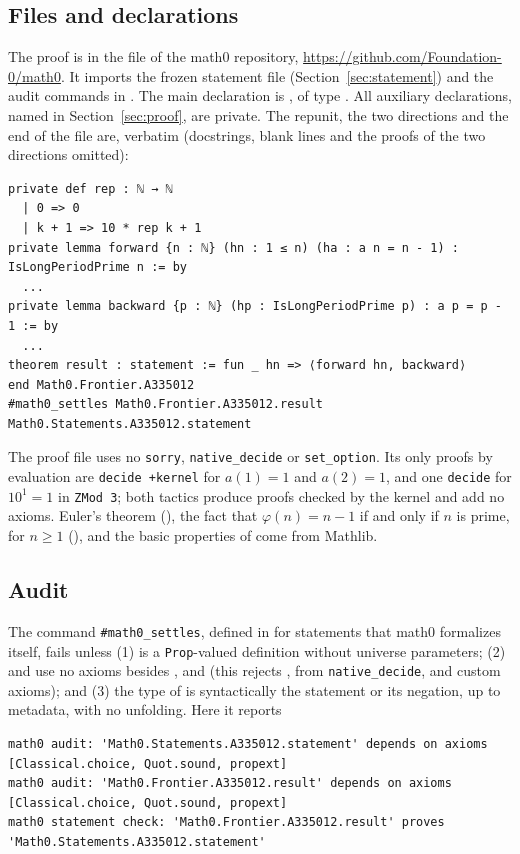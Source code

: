 \documentclass[11pt]{amsart}
\theoremstyle{plain}
\theoremstyle{definition}
\begin{document}
\subsection*{Files and declarations}
The proof is in the file  of the math0 repository, \url{https://github.com/Foundation-0/math0}. It imports the frozen statement file  (Section~\ref{sec:statement}) and the audit commands in . The main declaration is , of type . All auxiliary declarations, named in Section~\ref{sec:proof}, are private. The repunit, the two directions and the end of the file are, verbatim (docstrings, blank lines and the proofs of the two directions omitted):
\begin{lstlisting}
private def rep : ℕ → ℕ
  | 0 => 0
  | k + 1 => 10 * rep k + 1
private lemma forward {n : ℕ} (hn : 1 ≤ n) (ha : a n = n - 1) : IsLongPeriodPrime n := by
  ...
private lemma backward {p : ℕ} (hp : IsLongPeriodPrime p) : a p = p - 1 := by
  ...
theorem result : statement := fun _ hn => ⟨forward hn, backward⟩
end Math0.Frontier.A335012
#math0_settles Math0.Frontier.A335012.result Math0.Statements.A335012.statement
\end{lstlisting}
The proof file uses no \texttt{sorry}, \texttt{native\_decide} or \texttt{set\_option}. Its only proofs by evaluation are \texttt{decide +kernel} for $a(1)=1$ and $a(2)=1$, and one \texttt{decide} for $10^1=1$ in \texttt{ZMod 3}; both tactics produce proofs checked by the kernel and add no axioms. Euler's theorem (), the fact that $\varphi(n)=n-1$ if and only if $n$ is prime, for $n\ge1$ (), and the basic properties of  come from Mathlib.

\subsection*{Audit}
The command \texttt{\#math0\_settles}, defined in  for statements that math0 formalizes itself, fails unless (1)  is a \texttt{Prop}-valued definition without universe parameters; (2)  and  use no axioms besides ,  and  (this rejects ,  from \texttt{native\_decide}, and custom axioms); and (3) the type of  is syntactically the statement or its negation, up to metadata, with no unfolding. Here it reports
\begin{lstlisting}[basicstyle=\ttfamily\scriptsize]
math0 audit: 'Math0.Statements.A335012.statement' depends on axioms [Classical.choice, Quot.sound, propext]
math0 audit: 'Math0.Frontier.A335012.result' depends on axioms [Classical.choice, Quot.sound, propext]
math0 statement check: 'Math0.Frontier.A335012.result' proves 'Math0.Statements.A335012.statement'
\end{lstlisting}
\end{document}
